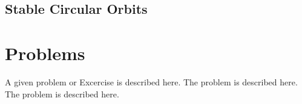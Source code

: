 \subsection{Stable Circular Orbits}




\section*{Problems}
%
\begin{prob}
\label{prob1}
A given problem or Excercise is described here. The
problem is described here. The problem is described here.
\end{prob}




